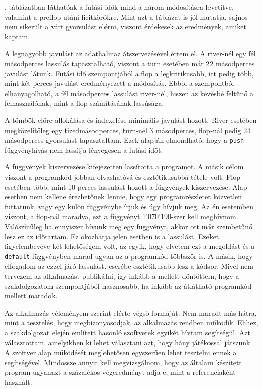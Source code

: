 . táblázatban láthatóak a futási idők mind a három módosításra levetítve, valamint a preflop utáni licitkörökre. Mint azt a táblázat is jól mutatja, sajnos nem sikerült a várt gyorsulást elérni, viszont érdekesek az eredmények, amiket kaptam.

A legnagyobb javulást az adathalmaz átszervezésével értem el. A river-nél egy fél másodperces lassulás tapasztalható, viszont a turn esetében már 22 másodperces javulást látunk. Futási idő szempontjából a flop a legkritikusabb, itt pedig több, mint két perces javulást eredményezett a módosítás. Ebből a szempontból elhanyagolható, a fél másodperces lassulást river-nél, hiszen az kevésbé feltűnő a felhasználónak, mint a flop számításának lassúsága.

A tömbök előre allokálása és indexelése minimális javulást hozott. River esetében megközelítőleg egy tizedmásodperces, turn-nél 3 másodperces, flop-nál pedig 24 másodperces gyorsulást tapasztaltam. Ezek alapján elmondható, hogy a \texttt{push} függvényhívás nem lassítja lényegesen a futási időt.

A függvények kiszervezése kifejezetten lassította a programot. A másik célom viszont a programkód jobban olvashatóvá és esztétikusabbá tétele volt. Flop esetében több, mint 10 perces lassulást hozott a függvények kiszervezése. Alap esetben nem kellene érezhetőnek lennie, hogy egy programrészletet közvetlen futtatunk, vagy egy külön függvénybe írjuk és úgy hívjuk meg. Az én esetemben viszont, a flop-nál maradva, ezt a függvényt 1'070'190-szer kell meghívnom. Valószínűleg ha ennyiszer hívunk meg egy függvényt, akkor ott már szembetűnő lesz ez az időtartam. Ez okozhatja jelen esetben is a lassulást. Ezeket figyelembevéve két lehetőségem volt, az egyik, hogy elvetem ezt a megoldást és a \texttt{default} függvényben marad ugyan az a programkód többször is. A másik, hogy elfogadom az ezzel járó lassulást, cserébe esztétikusabb lesz a kódsor. Mivel nem tervezem az alkalmazást publikálni, így inkább a mellett döntöttem, hogy a szakdolgozatom szempontjából hasznosabb, ha inkább az átlátható programkód mellett maradok.


Az alkalmazás véleményem szerint elérte végső formáját. Nem maradt más hátra, mint a tesztelés, hogy megbizonyosodjak, az alkalmazás rendben működik. Ehhez, a szakdolgozat elején említett hasonló szoftverek egyikét hívtam segítségül. Azt választottam, amelyikben ki lehet választani azt, hogy hány játékossal játszunk. A szoftver alap működését meglehetősen egyszerűen lehet tesztelni ennek a segítségével. Mindössze annyit kell megvizsgálnom, hogy az általam készített program ugyanazt a százalékos végeredményt adja-e, mint a referenciaként használt.

